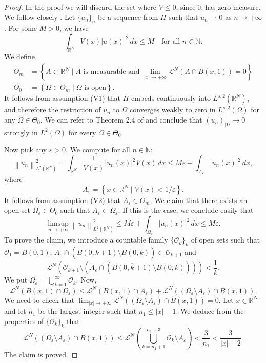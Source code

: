 \documentclass[11pt]{amsart}
\numberwithin{equation}{section}
\theoremstyle{remark}
\theoremstyle{definition}
\begin{document}
\begin{proof}
	In the proof we will discard the set where $V \leqslant 0$, since it has zero measure. We follow closely \cite{MR0481616}. Let $\{u_n\}_n$ be a sequence from $H$ such that $u_n \rightharpoonup 0$ as $n \to +\infty$. For some $M>0$, we have
	\[
	\int_{\mathbb{R}^N}V(x)|u(x)|^2 \, dx \leq M \quad\text{for all $n\in \mathbb{N}$}.
	\]
	We define
	\begin{align*}
	\Theta_m &= \left\{ A \subset \mathbb{R}^N \mid \text{$A$ is measurable and $\lim_{|x| \to +\infty} \mathcal{L}^N (A \cap B(x,1))=0$} \right\}\\
	\Theta_0 &= \left\{ \Omega \in \Theta_m \mid \text{$\Omega$ is open}\right\}.
	\end{align*}
	It follows from assumption (V1) that $H$ embeds continuously into $L^{s,2}(\mathbb{R}^N)$, and therefore
	the restriction of $u_n$ to $\Omega$ converges weakly to zero in $L^{s,2}(\Omega)$ for any $\Omega \in \Theta_0$. We can refer to Theorem 2.4 of \cite{MR0312241} and conclude that $(u_n)_{|\Omega} \to 0$ strongly in $L^2(\Omega)$ for every $\Omega \in \Theta_0$.
	
	Now pick any $\varepsilon>0$. We compute for all $n \in \mathbb{N}$:
	\begin{equation*}
	\left\| u_n \right\|_{L^2(\mathbb{R}^N)}^{2} = \int_{\mathbb{R}^N} \frac{1}{V(x)} \left| u_n(x) \right|^2 V(x) \, dx \leqslant M \varepsilon + \int_{A_\varepsilon} \left| u_n(x) \right|^2 \, dx,
	\end{equation*}
	where
	\[
	A_\varepsilon = \left\{ x \in \mathbb{R}^N \mid V(x) < 1/\varepsilon \right\}.
	\]
	It follows from assumption (V2) that $A_\varepsilon \in \Theta_m$. We claim that there exists an open set $\Omega_\varepsilon \in \Theta_0$ such that $A_\varepsilon \subset \Omega_\varepsilon$. If this is the case, we conclude easily that
	\[
	\limsup_{n \to +\infty} \left\| u_n \right\|_{L^2(\mathbb{R}^N)}^{2} \leqslant M \varepsilon + 
	\int_{\Omega_\varepsilon} \left| u_n(x) \right|^2 \, dx \leqslant M \varepsilon.
	\]
	To prove the claim, we introduce a countable family $\{\mathscr{O}_k\}_k$ of open sets such that $\mathscr{O}_1 = B(0,1)$, $A_\varepsilon \cap (\overline{B(0,k+1)}\setminus B(0,k)) \subset \mathscr{O}_{k+1}$ and 
	\[
	\mathcal{L}^N \left( \mathscr{O}_{k+1} \setminus \left( A_\varepsilon \cap (\overline{B(0,k+1)}\setminus B(0,k))
	\right)
	\right) < \frac{1}{k}.
	\]
	We put $\Omega_\varepsilon = \bigcup_{k=1}^\infty \mathscr{O}_k$. Now,
	\[
	\mathcal{L}^N (B(x,1) \cap \Omega_\varepsilon)  \leqslant \mathcal{L}^N( B(x,1) \cap A_\varepsilon) + \mathcal{L}^N ((\Omega_\varepsilon \setminus A_\varepsilon) \cap B(x,1)).
	\]
	We need to check that $\lim_{|x| \to +\infty} \mathcal{L}^N ((\Omega_\varepsilon \setminus A_\varepsilon) \cap B(x,1)) =0$. Let $x \in \mathbb{R}^N$ and let $n_1$ be the largest integer such that $n_1 \leqslant |x|-1$. We deduce from the properties of $\{\mathscr{O}_k\}_k$ that
	\[
	\mathcal{L}^N ((\Omega_\varepsilon \setminus A_\varepsilon) \cap B(x,1)) \leqslant \mathcal{L}^N \left( \bigcup_{k=n_1+1}^{n_1+3} \mathscr{O}_k \setminus A_\varepsilon \right) < \frac{3}{n_1} < \frac{3}{|x|-2}.
	\]
	The claim is proved.
	

\end{proof}
\end{document}
